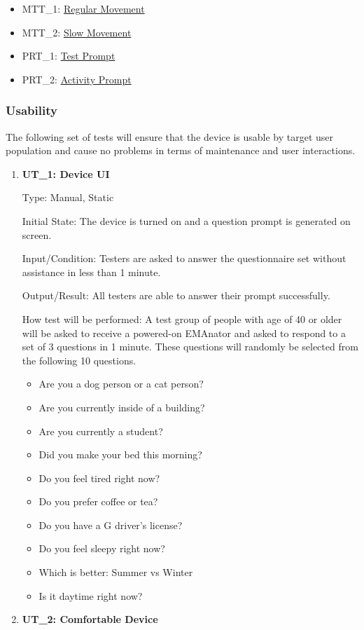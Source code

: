 \documentclass[12pt, titlepage]{article}
\begin{document}
\begin{itemize}
\item MTT\_1: \hyperref[MTT1]{Regular Movement}
\item MTT\_2: \hyperref[MTT2]{Slow Movement}
\item PRT\_1: \hyperref[PRT1]{Test Prompt}
\item PRT\_2: \hyperref[PRT2]{Activity Prompt}
\end{itemize}

\subsubsection{Usability}
The following set of tests will ensure that the device is usable by target user population and cause no problems in terms of maintenance and user interactions.		
\begin{enumerate}

\item\textbf{{UT\_1: Device UI\\}}\label{UT1}

Type: Manual, Static
					
Initial State: The device is turned on and a question prompt is generated on screen.
					
Input/Condition: Testers are asked to answer the questionnaire set without assistance in less than 1 minute.
					
Output/Result: All testers are able to answer their prompt successfully.
					
How test will be performed: A test group of people with age of 40 or older will be asked to receive a powered-on EMAnator and asked to respond to a set of 3 questions in 1 minute. These questions will randomly be selected from the following 10 questions.

\begin{itemize}
\item Are you a dog person or a cat person?
\item Are you currently inside of a building?
\item Are you currently a student?
\item Did you make your bed this morning?
\item Do you feel tired right now?
\item Do you prefer coffee or tea?
\item Do you have a G driver's license?
\item Do you feel sleepy right now?
\item Which is better: Summer vs Winter
\item Is it daytime right now?
\end{itemize}
\newpage
\item\textbf{{UT\_2: Comfortable Device\\}}\label{UT2}


\end{enumerate}
\end{document}
